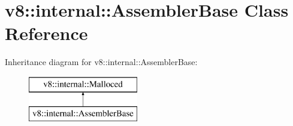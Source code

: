 \hypertarget{classv8_1_1internal_1_1_assembler_base}{}\section{v8\+:\+:internal\+:\+:Assembler\+Base Class Reference}
\label{classv8_1_1internal_1_1_assembler_base}
Inheritance diagram for v8\+:\+:internal\+:\+:Assembler\+Base\+:\begin{figure}[H]
\begin{center}
\leavevmode
\includegraphics[height=2.000000cm]{classv8_1_1internal_1_1_assembler_base}
\end{center}
\end{figure}
